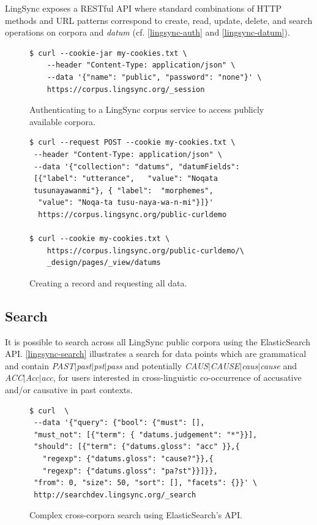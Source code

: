 \documentclass[11pt]{article}
\begin{document}
LingSync exposes a RESTful API where standard combinations of HTTP methods and
URL patterns correspond to create, read, update, delete, and search operations
on corpora and \emph{datum} (cf. \autoref{lingsync-auth} and
\autoref{lingsync-datum}).


\begin{figure}[h]
\scriptsize
\begin{verbatim}
$ curl --cookie-jar my-cookies.txt \
    --header "Content-Type: application/json" \
    --data '{"name": "public", "password": "none"}' \
    https://corpus.lingsync.org/_session
\end{verbatim}
\normalsize
\caption{Authenticating to a LingSync corpus service to access publicly
available corpora.}
\label{lingsync-auth}
\end{figure}

\begin{figure}[h]
\scriptsize
\begin{verbatim}
$ curl --request POST --cookie my-cookies.txt \
 --header "Content-Type: application/json" \
 --data '{"collection": "datums", "datumFields": 
 [{"label": "utterance",   "value": "Noqata 
 tusunayawanmi"}, { "label":  "morphemes",
  "value": "Noqa-ta tusu-naya-wa-n-mi"}]}' 
  https://corpus.lingsync.org/public-curldemo 

$ curl --cookie my-cookies.txt \
	https://corpus.lingsync.org/public-curldemo/\
    _design/pages/_view/datums
\end{verbatim}
\normalsize
\caption{Creating a record and requesting all data.}
\label{lingsync-datum}
\end{figure}


\subsection{Search}

It is possible to search across all LingSync public corpora using the
ElasticSearch API. \autoref{lingsync-search} illustrates a search for data
points which are grammatical and contain \textit{PAST$|$past$|$pst$|$pass} and
potentially \textit{CAUS$|$CAUSE$|$caus$|$cause} and \textit{ACC$|$Acc$|$acc},
for users interested in cross-linguistic co-occurrence of accusative and/or
causative in past contexts.

\begin{figure}[h]
\scriptsize
\begin{verbatim}
$ curl  \
 --data '{"query": {"bool": {"must": [],
 "must_not": [{"term": { "datums.judgement": "*"}}],
 "should": [{"term": {"datums.gloss": "acc" }},{ 
   "regexp": {"datums.gloss": "cause?"}},{
   "regexp": {"datums.gloss": "pa?st"}}]}},
 "from": 0, "size": 50, "sort": [], "facets": {}}' \
 http://searchdev.lingsync.org/_search
\end{verbatim}
\normalsize
\caption{Complex cross-corpora search using ElasticSearch's API.}
\label{lingsync-search}
\end{figure}
\end{document}
